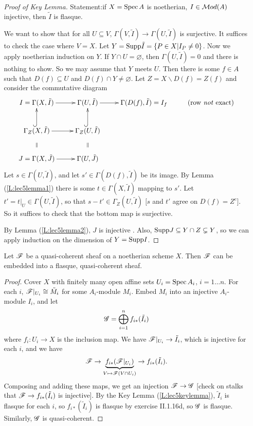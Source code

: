 \begin{proof}[Proof of Key Lemma]
Statement:if $X=\text{\rm Spec\,} A$ is noetherian, $I\in \mathcal{M}od(A)$ injective,
then $\tilde I$ is flasque.

We want to show that for all $U\subseteq V$, $\Gamma(V,\tilde
I)\to \Gamma(U,\tilde I)$ is
surjective.  It suffices to check the case
where $V=X$.  Let $Y=\text{\rm Supp} \tilde I = \{P\in X| I_P\not=0\}$.  Now
we apply noetherian induction on $Y$.  If $Y\cap U=\varnothing$,
then $\Gamma(U,\tilde I)=0$ and there is nothing to show.  So we
may assume that $Y$ meets $U$.  Then there is some $f\in A$ such
that $D(f)\subseteq U$ and $D(f)\cap Y\not=\varnothing$.  Let
$Z=X\smallsetminus D(f) = Z(f)$ and consider the commutative
diagram
\[\xymatrix{
 I=\Gamma(X,\tilde I) \ar[r] & \Gamma(U,\tilde I) \ar[r] & \Gamma(D(f),\tilde
 I)=I_f & \text{(row \emph{not} exact)}\\
 \Gamma_Z(X,\tilde I)\ar@{^(->}[u] \ar[r] & \Gamma_Z(U,\tilde
 I)\ar@{^(->}[u]\\
 J=\Gamma(X,\tilde J) \ar@{}[u]|{\parallel} \ar[r] & \Gamma(U,\tilde J)\ar@{}[u]|{\parallel}
 }\]
Let $s\in \Gamma(U,\tilde I)$, and let $s'\in \Gamma(D(f),\tilde
I)$ be its image.  By Lemma (\ref{L:lec5lemma1})  there is some $t\in
\Gamma(X,\tilde I)$ mapping to $s'$. Let $t'=t|_U\in
\Gamma(U,\tilde I)$, so that $s-t'\in \Gamma_Z(U,\tilde I)$ [$s$
and $t'$ agree on $D(f)=Z^c$].  So it suffices to check that the
bottom map is surjective.

By Lemma (\ref{L:lec5lemma2}), $J$ is injective .  Also, $\text{\rm Supp} J \subseteq Y\cap
Z \subsetneq Y$, so we can apply induction on the dimension of
$Y=\text{\rm Supp} I$.
\end{proof}

\begin{corollary}\label{C:lec5}
Let $\mathscr{F}$ be a quasi-coherent sheaf on a noetherian scheme $X$.
Then $\mathscr{F}$ can be embedded into a flasque, quasi-coherent sheaf.
\end{corollary}
\begin{proof}
Cover $X$ with finitely many open affine sets $U_i=\text{\rm Spec\,} A_i$,
$i=1\dots n$.  For each $i$, $\mathscr{F}|_{U_i} \cong \tilde M_i$ for some
$A_i$-module $M_i$.  Embed $M_i$ into an injective $A_i$-module
$I_i$, and let
\[
    \mathscr{G} = \bigoplus_{i=1}^n f_{i*}(\tilde I_i)
\]
where $f_i:U_i\to X$ is the inclusion map.  We have $\mathscr{F}|_{U_i}\to
\tilde I_i$, which is injective for each $i$, and we have
\[\mathscr{F}\to
\underbrace{f_{i*}(\mathscr{F}|_{U_i})}_{V\mapsto \mathscr{F}(V\cap U_i)} \to
f_{i*}(\tilde I_i).\] Composing and adding these maps, we get an
injection $\mathscr{F}\to \mathscr{G}$ [check on stalks that $\mathscr{F}\to f_{i*}(\tilde
I_i)$ is injective].  By the Key Lemma (\ref{L:lec5keylemma}),
$\tilde I_i$ is flasque for each $i$, so $f_{i*}(\tilde I_i)$ is
flasque by exercise II.1.16d, so $\mathscr{G}$ is flasque.  Similarly, $\mathscr{G}$
is quasi-coherent.
\end{proof}
